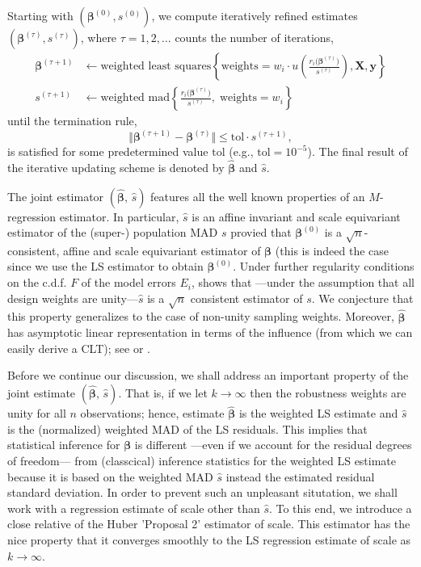 \documentclass[a4paper,11pt]{scrreprt}
\theoremstyle{remark}
\begin{document}
Starting with $(\bm \beta^{(0)}, s^{(0)})$, we compute iteratively refined estimates $(\bm \beta^{(\tau)}, s^{(\tau)})$, where $\tau=1,2,\ldots$ counts the number of iterations, 
\begin{align*}
   \bm \beta^{(\tau + 1)} &\leftarrow \text{weighted least squares}\left\{ \mathrm{weights} = w_i\cdot u\left( \frac{r_i\big(\bm \beta^{(\tau)}\big)}{s^{(\tau)}}\right), \bm X, \bm y \right\} \\ 
   s^{(\tau + 1)} &\leftarrow \text{weighted mad}\left\{ \frac{r_i\big(\bm \beta^{(\tau)}\big)}{s^{(\tau)}},\; \mathrm{weights}=w_i \right\} 
\end{align*}
\noindent until the termination rule,
\begin{equation*}
   \big\Vert \bm \beta^{(\tau + 1)} - \bm \beta^{(\tau)} \big\Vert \leq \mathrm{tol} \cdot s^{(\tau + 1)},
\end{equation*}
\noindent is satisfied for some predetermined value $\mathrm{tol}$ (e.g., $\mathrm{tol} = 10^{-5}$). The final result of the iterative updating scheme is denoted by $\widehat{\bm \beta}$ and $\widehat{s}$. 

The joint estimator $(\widehat{\bm \beta}, \, \widehat{s})$ features all the well known properties of an $M$-regression estimator. In particular, $\widehat{s}$ is an affine invariant and scale equivariant estimator of the (super-) population MAD $s$ provied that $\bm \beta^{(0)}$ is a $\sqrt{n}$-consistent, affine and scale equivariant estimator of $\bm \beta$ (this is indeed the case since we use the LS estimator to obtain $\bm \beta^{(0)}$. Under further regularity conditions on the c.d.f. $F$ of the model errors $E_i$, \citet{welsh1986} shows that ---under the assumption that all design weights are unity---$\widehat{s}$ is a $\sqrt{n}$ consistent estimator of $s$. We conjecture that this property generalizes to the case of non-unity sampling weights. Moreover, $\widehat{\bm \beta}$ has asymptotic linear representation in terms of the influence (from which we can easily derive a CLT); see \citet{welsh1986} or \citet[][ch. 5]{jureckovasen1996}.

Before we continue our discussion, we shall address an important property of the joint estimate $(\widehat{\bm \beta}, \, \widehat{s})$. That is, if we let $k \rightarrow \infty$ then the robustness weights are unity for all $n$ observations; hence, estimate $\widehat{\bm \beta}$ is the weighted LS estimate and $\widehat{s}$ is the (normalized) weighted MAD of the LS residuals. This implies that statistical inference for $\bm \beta$ is different ---even if we account for the residual degrees of freedom--- from (classcical) inference statistics for the weighted LS estimate because it is based  on the weighted MAD $\widehat{s}$ instead the estimated residual standard deviation. In order to prevent such an unpleasant situtation, we shall work with a regression estimate of scale other than $\widehat{s}$. To this end, we introduce a close relative of the Huber 'Proposal 2' estimator of scale. This estimator has the nice property that it converges smoothly to the LS regression estimate of scale as $k \rightarrow \infty$.  
\end{document}
